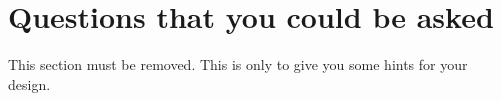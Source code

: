 \subsubsection{\taskA}


\subsubsection{\taskB}


\subsubsection{\taskC}


\section{Questions that you could be asked}

This section must be removed. This is only to give you some hints for your design. 

